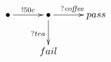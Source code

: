 $\xymatrix{
    \bullet \ar[r]^{!50c} & \bullet \ar[r]^{\mathit{?coffee}} \ar[d]_{?tea} & {pass}\\
    & {fail}}$
